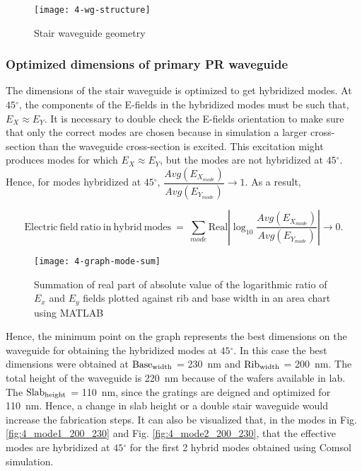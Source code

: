 \documentclass[../report.tex]{subfiles}
\begin{document}
\begin{figure}[H] %
	\centering
	\texttt{[image: 4-wg-structure]}
	\caption{Stair waveguide geometry}
	\label{fig:4_wg_structure}
\end{figure}


\subsubsection{Optimized dimensions of primary PR waveguide}
The dimensions of the stair waveguide is optimized to get hybridized modes. At $45{^\circ}$, the components of the E-fields in the hybridized modes must be such that, $E_X \approx E_Y$. It is necessary to double check the E-fields orientation to make sure that only the correct modes are chosen because in simulation a larger cross-section than the waveguide cross-section is excited. This excitation might produces modes for which $E_X \approx E_Y$, but the modes are not hybridized at $45{^\circ}$. Hence, for modes hybridized at $45{^\circ}$, $\dfrac {Avg(E_{X_{mode}})} {Avg(E_{Y_{mode}})} \rightarrow 1$. As a result, 

\begin{equation}\label{eq:wg_dim_eq}
\mathrm{Electric ~ field ~ ratio ~ in ~ hybrid ~ modes} ~ = ~ \sum _{mode}\mathrm{Real}\left| \log _{10}\dfrac {Avg(E_{X_{mode}})} {Avg(E_{Y_{mode}})}\right| \rightarrow 0. 
\end{equation}

\begin{figure}[H] %
	\centering
	\texttt{[image: 4-graph-mode-sum]}
	\caption{Summation of real part of absolute value of the logarithmic ratio of $E_x$ and $E_y$ fields plotted against rib and base width in an area chart using MATLAB}
	\label{fig:4_graph_mode_sum}
\end{figure}  
\noindent Hence, the minimum point on the graph represents the best dimensions on the waveguide for obtaining the hybridized modes at $45{^\circ}$. In this case the best dimensions were obtained at $\mathrm{Base_{width}}$ = \SI{230}{\nano \meter} and $\mathrm{Rib_{width}}$ = \SI{200}{\nano \meter}. The total height of the waveguide is \SI{220}{\nano \meter} because of the wafers available in lab. The $\mathrm{Slab_{height}}$ = \SI{110}{\nano \meter}, since the gratings are deigned and optimized for \SI{110}{\nano \meter}. Hence, a change in slab height or a double stair waveguide would increase the fabrication steps. It can also be visualized that, in the modes in Fig. \ref{fig:4_mode1_200_230} and Fig. \ref{fig:4_mode2_200_230}, that the effective modes are hybridized at $45{^\circ}$ for the first 2 hybrid modes obtained using Comsol simulation. 
\end{document}
